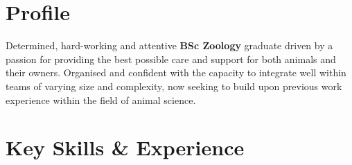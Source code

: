 \documentclass[a4paper, 10pt]{extarticle} %
\begin{document}
\vspace{-0.5cm}

\section{Profile}

{\small Determined, hard-working and attentive \textbf{BSc Zoology} graduate driven by a passion for providing the best possible care and support for both animals and their owners. Organised and confident with the capacity to integrate well within teams of varying size and complexity, now seeking to build upon previous work experience within the field of animal science. }



\section{Key Skills \& Experience}
\end{document}

